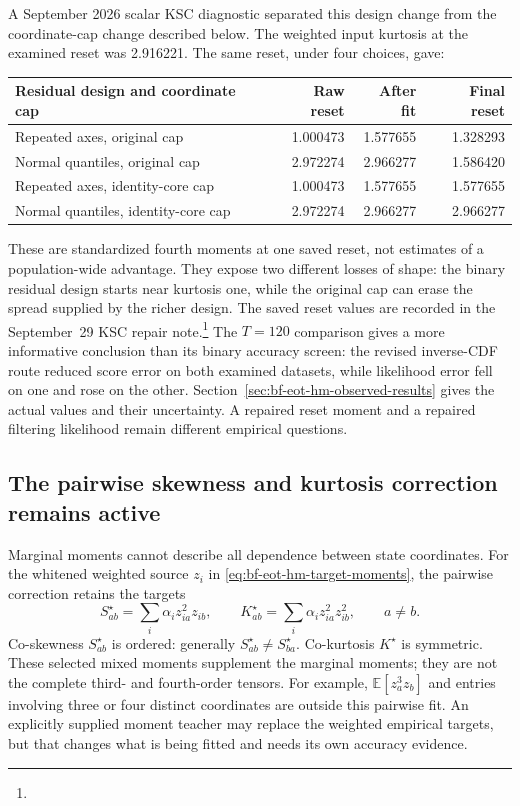 A September 2026 scalar KSC diagnostic separated this design change from the
coordinate-cap change described below.  The weighted input kurtosis at the
examined reset was 2.916221.  The same reset, under four choices, gave:
\begin{center}
\begin{tabular}{lrrr}
\toprule
Residual design and coordinate cap & Raw reset & After fit & Final reset\\
\midrule
Repeated axes, original cap & 1.000473 & 1.577655 & 1.328293\\
Normal quantiles, original cap & 2.972274 & 2.966277 & 1.586420\\
Repeated axes, identity-core cap & 1.000473 & 1.577655 & 1.577655\\
Normal quantiles, identity-core cap & 2.972274 & 2.966277 & 2.966277\\
\bottomrule
\end{tabular}
\end{center}
These are standardized fourth moments at one saved reset, not estimates of a
population-wide advantage.  They expose two different losses of shape: the
binary residual design starts near kurtosis one, while the original cap can
erase the spread supplied by the richer design.  The saved reset values are recorded in the September~29 KSC
repair note.\footnote{}
The \(T=120\) comparison gives a more informative conclusion than its
binary accuracy screen: the revised inverse-CDF route reduced score error on
both examined datasets, while likelihood error fell on one and rose on the
other.  Section~\ref{sec:bf-eot-hm-observed-results} gives the actual values and
their uncertainty.  A repaired reset moment and a repaired filtering likelihood
remain different empirical questions.

\subsection{The pairwise skewness and kurtosis correction remains active}
\label{sec:bf-eot-hm-pairwise-repair}

Marginal moments cannot describe all dependence between state coordinates.
For the whitened weighted source \(z_i\) in
\eqref{eq:bf-eot-hm-target-moments}, the pairwise correction retains the targets
\begin{equation}
 S^\star_{ab}=\sum_i\alpha_i z_{ia}^{2}z_{ib},\qquad
 K^\star_{ab}=\sum_i\alpha_i z_{ia}^{2}z_{ib}^{2},\qquad a\ne b.
 \label{eq:bf-eot-hm-pair-targets}
\end{equation}
Co-skewness \(S^\star_{ab}\) is ordered: generally
\(S^\star_{ab}\ne S^\star_{ba}\).  Co-kurtosis \(K^\star\) is symmetric.
These selected mixed moments supplement the marginal moments; they are not the
complete third- and fourth-order tensors.  For example,
\(\mathbb E[z_a^3z_b]\) and entries involving three or four distinct coordinates
are outside this pairwise fit.  An explicitly supplied moment teacher may
replace the weighted empirical targets, but that changes what is being fitted
and needs its own accuracy evidence.

